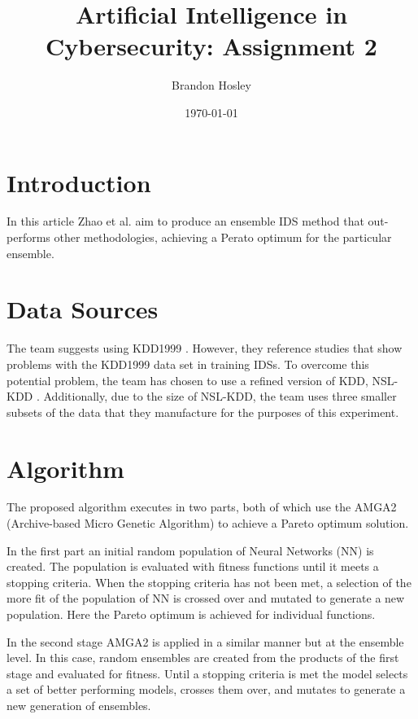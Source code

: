 \documentclass[]{article}
\title{Artificial Intelligence in Cybersecurity: Assignment 2}
\author{Brandon Hosley}
\date{\today}
\begin{document}
	\maketitle
	
\section{Introduction}

In this article \cite{Zhao2020} Zhao et al. aim to produce an ensemble IDS method that out-performs other methodologies, achieving a Perato optimum for the particular ensemble.

\section{Data Sources}

The team suggests using KDD1999 \cite{Kdd1999}. 
However, they reference studies
\cite{Brown2009, Mchugh2000, Engen2010}
that show problems with the KDD1999 data set in training IDSs.
To overcome this potential problem, the team has chosen to use a refined version of KDD, NSL-KDD \cite{Tavallaee2011}.
Additionally, due to the size of NSL-KDD, the team uses three smaller subsets of the data that they manufacture for the purposes of this experiment.

\section{Algorithm}

The proposed algorithm executes in two parts, both of which use the AMGA2 \cite{Tiwari2011} (Archive-based Micro Genetic Algorithm) to achieve a Pareto optimum solution.

In the first part an initial random population of Neural Networks (NN) is created.
The population is evaluated with fitness functions until it meets a stopping criteria.
When the stopping criteria has not been met, a selection of the more fit of the population of NN is crossed over and mutated to generate a new population.
Here the Pareto optimum is achieved for individual functions. 

In the second stage AMGA2 is applied in a similar manner but at the ensemble level.
In this case, random ensembles are created from the products of the first stage and evaluated for fitness.
Until a stopping criteria is met the model selects a set of better performing models, crosses them over, and mutates to generate a new generation of ensembles.
\end{document}
